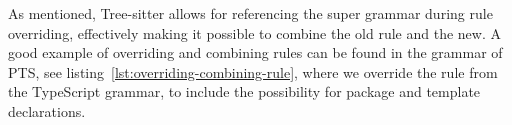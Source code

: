 As mentioned, Tree-sitter allows for referencing the super grammar during rule overriding, effectively making it possible to combine the old rule and the new.
A good example of overriding and combining rules can be found in the grammar of PTS, see listing~\vref{lst:overriding-combining-rule}, where we override the  rule from the TypeScript grammar, to include the possibility for package and template declarations.



